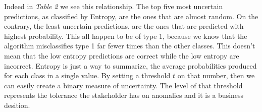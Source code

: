 \documentclass[11pt,twoside]{article}
\numberwithin{Theorem}{section}
\numberwithin{Definition}{section}
\numberwithin{Lemma}{section}
\numberwithin{Algorithm}{section}
\numberwithin{equation}{section}
\begin{document}
\begin{table}[!ht]
\centering
{}
\caption{Top five most and least anomalous datapoints by Entropy}
\label{tab:entropy}
\end{table}

Indeed in \textit{Table 2} we see this relationship. The top five most uncertain predictions, as classified by Entropy, are the ones that are almost random. On the contrary, the least uncertain predictions, are the ones that are predicted with highest probability. This all happen to be of \textsf{type 1}, because we know that the algorithm misclassifies \textsf{type 1} far fewer times than the other classes. This doesn't mean that the low entropy predictions are correct while the low entropy are incorrect. Entropy is just a way to summarize, the average probabilities produced for each class in a single value. By setting a threshold $t$ on that number, then we can easily create a binary measure of uncertainty. The level of that threshold represents the tolerance the stakeholder has on anomalies and it is a business desition.
\end{document}
